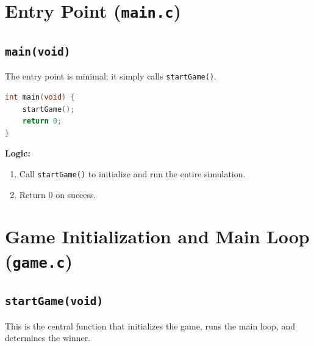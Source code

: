 \documentclass[12pt,a4paper]{article}
\begin{document}
\newpage

\section{Entry Point (\texttt{main.c})}

\subsection{\texttt{main(void)}}
The entry point is minimal; it simply calls \texttt{startGame()}.
\begin{lstlisting}[language=C]
int main(void) {
    startGame();
    return 0;
}
\end{lstlisting}

\textbf{Logic:}
\begin{enumerate}[noitemsep]
    \item Call \texttt{startGame()} to initialize and run the entire simulation.
    \item Return 0 on success.
\end{enumerate}

\newpage

\section{Game Initialization and Main Loop (\texttt{game.c})}

\subsection{\texttt{startGame(void)}}
This is the central function that initializes the game, runs the main loop, and determines the winner.
\end{document}
